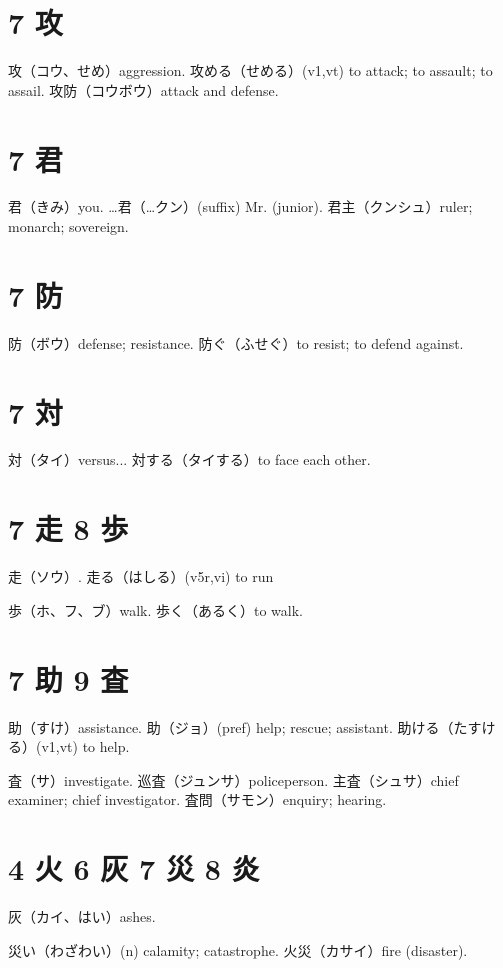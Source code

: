 \section{7 攻}

攻（コウ、せめ）aggression.
攻める（せめる）(v1,vt) to attack; to assault; to assail.
攻防（コウボウ）attack and defense.

\section{7 君}

君（きみ）you.
…君（…クン）(suffix) Mr. (junior).
君主（クンシュ）ruler; monarch; sovereign.

\section{7 防}

防（ボウ）defense; resistance.
防ぐ（ふせぐ）to resist; to defend against.

\section{7 対}

対（タイ）versus...
対する（タイする）to face each other.

\section{7 走 8 歩}

走（ソウ）.
走る（はしる）(v5r,vi) to run

歩（ホ、フ、ブ）walk.
歩く（あるく）to walk.

\section{7 助 9 査}

助（すけ）assistance.
助（ジョ）(pref) help; rescue; assistant.
助ける（たすける）(v1,vt) to help.

査（サ）investigate.
巡査（ジュンサ）policeperson.
主査（シュサ）chief examiner; chief investigator.
査問（サモン）enquiry; hearing.

\section{4 火 6 灰 7 災 8 炎}

灰（カイ、はい）ashes.

災い（わざわい）(n) calamity; catastrophe.
火災（カサイ）fire (disaster).


